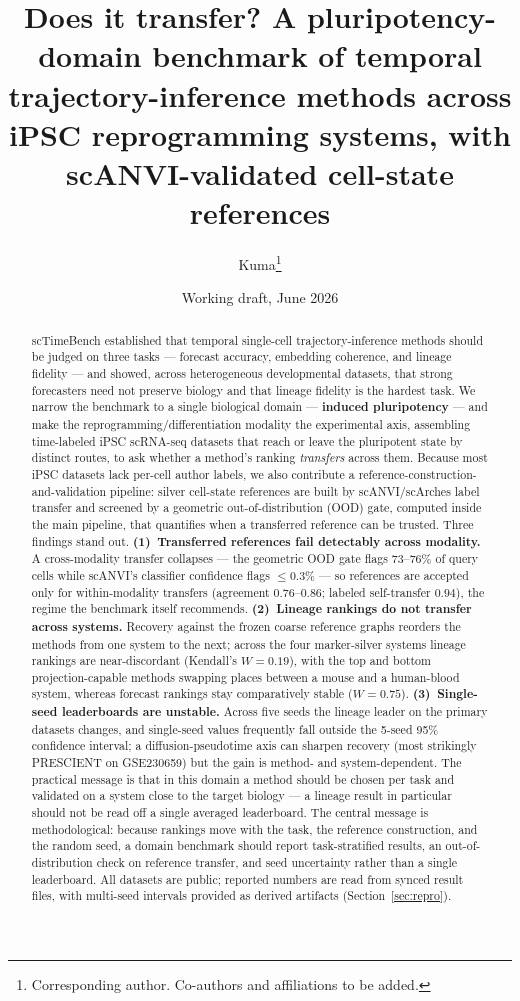 \documentclass[11pt]{article}
\title{\bfseries Does it transfer? A pluripotency-domain benchmark of temporal
trajectory-inference methods across iPSC reprogramming systems, with
scANVI-validated cell-state references}
\author[1]{Kuma\thanks{Corresponding author. Co-authors and affiliations to be
added.}}
\affil[1]{\small Graduate School of Frontier Sciences, The University of Tokyo}
\date{Working draft, June 2026}
\begin{document}
\maketitle

\begin{abstract}
\noindent
scTimeBench \citep{osakwe2026} established that temporal single-cell
trajectory-inference methods should be judged on three tasks --- forecast accuracy,
embedding coherence, and lineage fidelity --- and showed, across heterogeneous
developmental datasets, that strong forecasters need not preserve biology and that
lineage fidelity is the hardest task. We narrow the benchmark to a single biological
domain --- \textbf{induced pluripotency} --- and make the
reprogramming/differentiation modality the experimental axis, assembling time-labeled
iPSC scRNA-seq datasets that reach or leave the pluripotent state by distinct routes,
to ask whether a method's ranking \emph{transfers} across them. Because most iPSC
datasets lack per-cell author labels, we also contribute a
reference-construction-and-validation pipeline: silver cell-state references are built
by scANVI/scArches label transfer and screened by a geometric out-of-distribution
(OOD) gate, computed inside the main pipeline, that quantifies when a transferred
reference can be trusted. Three findings stand out. \textbf{(1)~Transferred references
fail detectably across modality.} A cross-modality transfer collapses --- the geometric
OOD gate flags $73$--$76\%$ of query cells while scANVI's classifier confidence flags
$\leq0.3\%$ --- so references are accepted only for within-modality transfers (agreement
$0.76$--$0.86$; labeled self-transfer $0.94$), the regime the benchmark itself
recommends. \textbf{(2)~Lineage rankings do not transfer across systems.} Recovery
against the frozen coarse reference graphs reorders the methods from one system to the
next; across the four marker-silver systems lineage rankings are near-discordant
(Kendall's $W=0.19$), with the top and bottom projection-capable methods swapping places
between a mouse and a human-blood system, whereas forecast rankings stay comparatively
stable ($W=0.75$). \textbf{(3)~Single-seed leaderboards are unstable.} Across five seeds
the lineage leader on the primary datasets changes, and single-seed values frequently
fall outside the 5-seed 95\% confidence interval; a diffusion-pseudotime axis can
sharpen recovery (most strikingly PRESCIENT on GSE230659) but the gain is method- and
system-dependent. The practical message is that in this domain a method should be chosen
per task and validated on a system close to the target biology --- a lineage result in
particular should not be read off a single averaged leaderboard. The central message is methodological: because rankings move with the task, the reference construction, and the random seed, a domain benchmark should report task-stratified results, an out-of-distribution check on reference transfer, and seed uncertainty rather than a single leaderboard. All datasets are public;
reported numbers are read from synced result files, with multi-seed intervals provided as
derived artifacts (Section~\ref{sec:repro}).
\end{abstract}
\end{document}
